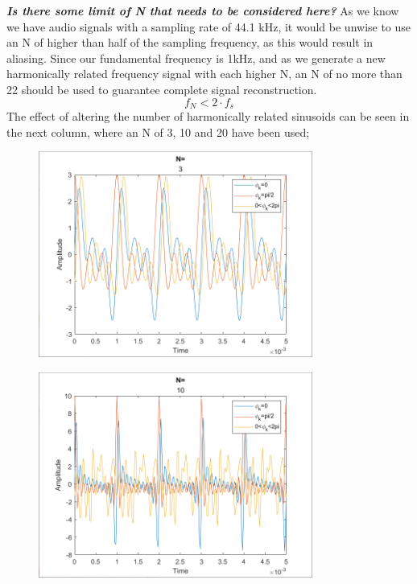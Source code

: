 \documentclass[journal]{IEEEtran}
\begin{document}
\textbf{\textit{Is there some limit of N that needs to be considered here?}}
\newline
As we know we have audio signals with a sampling rate of 44.1 kHz, it would be unwise to use an N of higher than half of the sampling frequency, as this would result in aliasing. Since our fundamental frequency is 1kHz, and as we generate a new harmonically related frequency signal with each higher N, an N of no more than 22 should be used to guarantee complete signal reconstruction.
\newline
\begin{equation}
     f_N < 2 \cdot f_s
\end{equation}
\newline
The effect of altering the number of harmonically related sinusoids can be seen in the next column, where an N of 3, 10 and 20 have been used;
\newline
\begin{figure}[H]
    \centering
    \includegraphics[width=9cm]{assignment_01/plots/N=3.png}
    \label{fig:N=3}
\end{figure}

\begin{figure}[H]
    \centering
    \includegraphics[width=9cm]{assignment_01/plots/N=10.png}
    \label{fig:N=10}
\end{figure}
\end{document}
